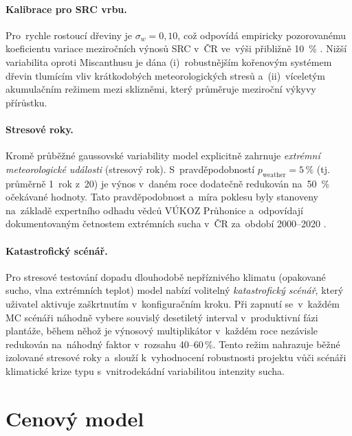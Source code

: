 \paragraph{Kalibrace pro SRC vrbu.}
Pro~rychle rostoucí dřeviny je $\sigma_w = 0{,}10$, což odpovídá
empiricky pozorovanému koeficientu variace meziročních výnosů SRC
v~ČR ve~výši přibližně 10~\% \citep{knapek_2024}. Nižší variabilita
oproti Miscanthusu je dána (i)~robustnějším kořenovým systémem
dřevin tlumícím vliv krátkodobých meteorologických stresů
a~(ii)~víceletým akumulačním režimem mezi sklizněmi, který
průměruje meziroční výkyvy přírůstku.

\paragraph{Stresové roky.}
Kromě průběžné gaussovské variability model explicitně zahrnuje
\textit{extrémní meteorologické události} (stresový rok). S~pravděpodobností
$p_{\text{weather}} = 5\,\%$ (tj. průměrně 1~rok z~20) je výnos
v~daném roce dodatečně redukován na~50~\% očekávané hodnoty.
Tato pravděpodobnost a~míra poklesu byly stanoveny na~základě
expertního odhadu vědců VÚKOZ Průhonice a~odpovídají dokumentovaným
četnostem extrémních sucha v~ČR za~období 2000--2020
\citep{VUKOZ2026}.

\paragraph{Katastrofický scénář.}
Pro stresové testování dopadu dlouhodobě nepříznivého klimatu
(opakované sucho, vlna extrémních teplot) model nabízí volitelný
\emph{katastrofický scénář}, který uživatel aktivuje zaškrtnutím
v~konfiguračním kroku. Při zapnutí se~v~každém MC scénáři náhodně
vybere souvislý desetiletý interval v~produktivní fázi plantáže,
během něhož je výnosový multiplikátor v~každém roce nezávisle redukován
na~náhodný faktor v~rozsahu 40--60\,\%. Tento režim nahrazuje běžné
izolované stresové roky a~slouží k~vyhodnocení robustnosti projektu
vůči scénáři klimatické krize typu  s~vnitrodekádní
variabilitou intenzity sucha.


\section{Cenový model}
\label{sec:cenovy_model}

